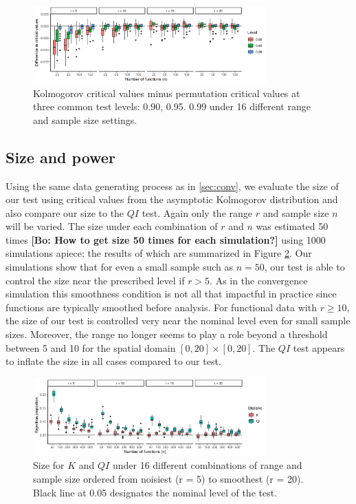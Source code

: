 \documentclass[12pt]{article}
\newcommand{\bl}[1]{\color{Red}\textbf{[Bo: #1]}\normalcolor}
\begin{document}
\begin{figure}
	\begin{center}
    \includegraphics[width=0.80\textwidth,valign=c]{conv/conv2.png}
    \caption{Kolmogorov critical values minus permutation critical values at three common test levels: 0.90, 0.95. 0.99 under 16 different range and sample size settings.}
    \label{crit}
    \end{center}
\end{figure}

\subsection{Size and power} \label{size}
Using the same data generating process as in \ref{sec:conv},  we evaluate the size of our test using critical values from the asymptotic Kolmogorov distribution and also compare our size to the $QI$ test. 
Again only the range $r$ and sample size $n$ will be varied. The size under each combination of $r$ and $n$ was estimated 50 times \bl{How to get size 50 times for each simulation?} using 1000 simulations apiece; the results of which are summarized in Figure \ref{size2d}.  
Our simulations show that for even a small sample such as $n = 50$, our test is able to control the size near the prescribed level if $r > 5$. As in the convergence simulation this smoothness condition is not all that impactful in practice since functions are typically smoothed before analysis. For functional data with $r \geq 10$, the size of our test is controlled very near the nominal level even for small sample sizes. Moreover, the range no longer seems to play a role beyond a threshold between 5 and 10 for the spatial domain $[0, 20] \times [0, 20]$. The $QI$ test appears to inflate the size in all cases compared to our test. 

\begin{figure}
	\begin{center}
    \includegraphics[width=0.8\textwidth,valign=c]{size/size2d2.png}
    \caption{Size for $K$ and $QI$ under 16 different combinations of range and sample size ordered from noisiest (r = 5) to smoothest (r = 20). Black line at 0.05 designates the nominal level of the test.}
    \label{size2d}
    \end{center}
\end{figure}
\end{document}
